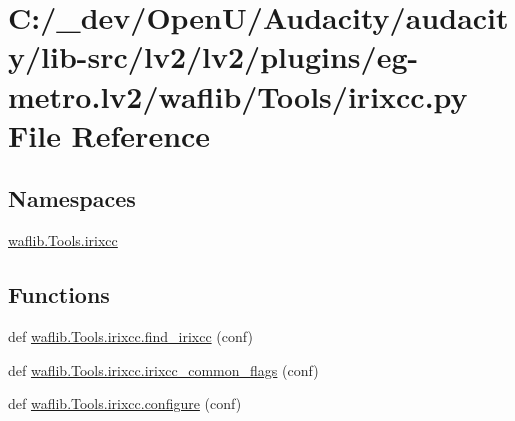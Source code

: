 \hypertarget{lv2_2plugins_2eg-metro_8lv2_2waflib_2_tools_2irixcc_8py}{}\section{C\+:/\+\_\+dev/\+Open\+U/\+Audacity/audacity/lib-\/src/lv2/lv2/plugins/eg-\/metro.lv2/waflib/\+Tools/irixcc.py File Reference}
\label{lv2_2plugins_2eg-metro_8lv2_2waflib_2_tools_2irixcc_8py}
\subsection*{Namespaces}
\begin{DoxyCompactItemize}
\item 
 \hyperlink{namespacewaflib_1_1_tools_1_1irixcc}{waflib.\+Tools.\+irixcc}
\end{DoxyCompactItemize}
\subsection*{Functions}
\begin{DoxyCompactItemize}
\item 
def \hyperlink{namespacewaflib_1_1_tools_1_1irixcc_a1b02ebdb6204ff3322531ba515fe187c}{waflib.\+Tools.\+irixcc.\+find\+\_\+irixcc} (conf)
\item 
def \hyperlink{namespacewaflib_1_1_tools_1_1irixcc_a636ab22dd5bfc5c90d23c109ff5c482f}{waflib.\+Tools.\+irixcc.\+irixcc\+\_\+common\+\_\+flags} (conf)
\item 
def \hyperlink{namespacewaflib_1_1_tools_1_1irixcc_a9f81cd5d34e60c61913d7de7bb9bd224}{waflib.\+Tools.\+irixcc.\+configure} (conf)
\end{DoxyCompactItemize}
